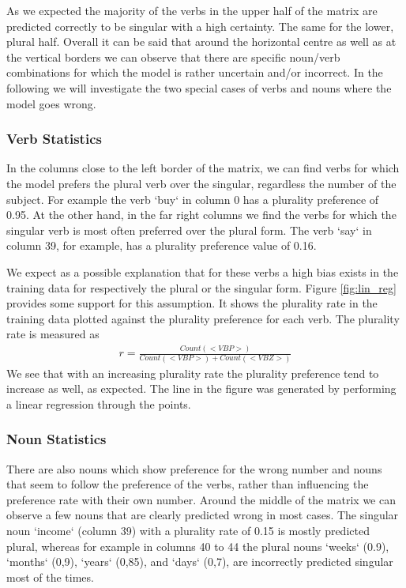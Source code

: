 As we expected the majority of the verbs in the upper half of the matrix are predicted correctly to be singular with a high certainty. The same for the lower, plural half. Overall it can be said that around the horizontal centre 
as well as at the vertical borders we can observe that there are specific 
noun/verb combinations for which the model is rather uncertain and/or incorrect. 
In the following we will investigate the two special cases of verbs and nouns where the model goes wrong.

\subsubsection{Verb Statistics}

In the columns close to the left border of the matrix, we can find verbs for which the model prefers the plural verb over the singular, regardless the number of the subject. For example the verb `buy` in column 0 has a plurality preference of 0.95. At the other hand, in the far right columns we find the verbs for which the singular verb is most often preferred over the plural form. The verb `say` in column 39, for example, has a plurality preference value of 0.16.

We expect as a possible explanation that for these verbs a high bias exists
in the training data for respectively the plural or the singular form.
Figure \ref{fig:lin_reg} provides some support for this assumption. It shows the plurality rate in the training data plotted against the plurality preference for each verb. 
The plurality rate is measured as
\begin{align*}
	r = \frac{Count(<VBP>)}{Count(<VBP>) + Count(<VBZ>)} 
\end{align*}
We see that with an increasing plurality rate the plurality preference tend to increase as well, as expected. The line in the figure was generated by performing a linear regression through the points. 

\subsubsection{Noun Statistics}

There are also nouns which show preference for the wrong number and nouns
that seem to follow the preference of the verbs, 
rather than influencing the preference rate with their own number.
Around the middle of the matrix we can observe a few nouns that are clearly predicted wrong in most cases. The singular noun `income` (column 39) with a plurality rate of 0.15 is mostly predicted plural, whereas for example in columns 40 to 44 the plural nouns `weeks` (0.9), `months` (0,9), `years` (0,85), and `days` (0,7), are incorrectly predicted singular most of the times.

